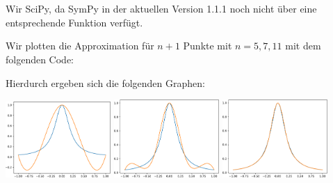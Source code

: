 \section{}

Wir SciPy, da SymPy in der aktuellen Version 1.1.1 noch nicht über eine entsprechende Funktion verfügt.



Wir plotten die Approximation für $n+1$ Punkte mit $n = 5, 7, 11$ mit dem folgenden Code:



Hierdurch ergeben sich die folgenden Graphen:

\begin{center}
  \includegraphics[width = 0.3\textwidth]{chapter_09/exercise_09_51_figure_1.pdf}
  \hspace{1em}
  \includegraphics[width = 0.3\textwidth]{chapter_09/exercise_09_51_figure_2.pdf}
  \hspace{1em}
  \includegraphics[width = 0.3\textwidth]{chapter_09/exercise_09_51_figure_3.pdf}
\end{center}
